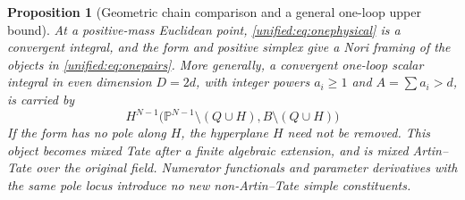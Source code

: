 \documentclass[11pt,a4paper,oneside]{article}
\theoremstyle{plain}
\newtheorem{proposition}[theorem]{Proposition}
\theoremstyle{definition}
\theoremstyle{remark}
\numberwithin{equation}{section}
\begin{document}
\begin{proposition}[Geometric chain comparison and a general one-loop upper bound]\label{unified:prop:onecarrier}
At a positive-mass Euclidean point, \eqref{unified:eq:onephysical} is a convergent integral,
and the form and positive simplex give a Nori framing of the objects in \eqref{unified:eq:onepairs}.
More generally, a convergent one-loop scalar integral in even dimension $D=2d$, with integer powers $a_i\ge1$ and $A=\sum a_i>d$,
is carried by
\[
 H^{N-1}\bigl(\mathbb P^{N-1}\setminus(Q\cup H),
                    B\setminus(Q\cup H)\bigr)
\]
If the form has no pole along $H$, the hyperplane $H$ need not be removed.
This object becomes mixed Tate after a finite algebraic extension, and is mixed Artin--Tate over the original field.
Numerator functionals and parameter derivatives with the same pole locus introduce no new non-Artin--Tate simple constituents.
\end{proposition}
\end{document}
